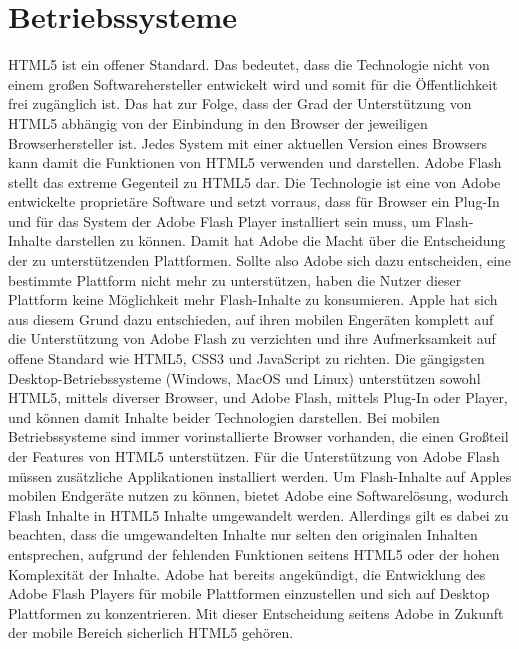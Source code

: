 \section{Betriebssysteme}
HTML5 ist ein offener Standard. Das bedeutet, dass die Technologie nicht
von einem großen Softwarehersteller entwickelt wird und somit für die
Öffentlichkeit frei zugänglich ist. Das hat zur Folge, dass der Grad der
Unterstützung von HTML5 abhängig von der Einbindung in den Browser der
jeweiligen Browserhersteller ist. Jedes System mit einer aktuellen Version
eines Browsers kann damit die Funktionen von HTML5 verwenden und darstellen.
\newline\newline
Adobe Flash stellt das extreme Gegenteil zu HTML5 dar. Die Technologie ist
eine von Adobe entwickelte proprietäre Software und setzt vorraus, dass für
Browser ein Plug-In und für das System der Adobe Flash Player installiert sein
muss, um Flash-Inhalte darstellen zu können. Damit hat Adobe die Macht über die
Entscheidung der zu unterstützenden Plattformen. Sollte also Adobe sich dazu
entscheiden, eine bestimmte Plattform nicht mehr zu unterstützen, haben die
Nutzer dieser Plattform keine Möglichkeit mehr Flash-Inhalte zu konsumieren.
Apple hat sich aus diesem Grund dazu entschieden, auf ihren mobilen Engeräten
komplett auf die Unterstützung von Adobe Flash zu verzichten und ihre
Aufmerksamkeit auf offene Standard wie HTML5, CSS3 und JavaScript zu richten.
\newline\newline
Die gängigsten Desktop-Betriebssysteme (Windows, MacOS und Linux)
unterstützen sowohl HTML5, mittels diverser Browser, und Adobe Flash, mittels
Plug-In oder Player, und können damit Inhalte beider Technologien darstellen.
Bei mobilen Betriebssysteme sind immer vorinstallierte Browser vorhanden,
die einen Großteil der Features von HTML5 unterstützen. Für die Unterstützung
von Adobe Flash müssen zusätzliche Applikationen installiert werden.
\newline\newline
Um Flash-Inhalte auf Apples mobilen Endgeräte nutzen zu können, bietet Adobe
eine Softwarelösung, wodurch Flash Inhalte in HTML5 Inhalte umgewandelt werden.
Allerdings gilt es dabei zu beachten, dass die umgewandelten Inhalte nur
selten den originalen Inhalten entsprechen, aufgrund der fehlenden Funktionen
seitens HTML5 oder der hohen Komplexität der Inhalte. Adobe hat bereits
angekündigt, die Entwicklung des Adobe Flash Players für mobile Plattformen
einzustellen und sich auf Desktop Plattformen zu konzentrieren. Mit dieser
Entscheidung seitens Adobe in Zukunft der mobile Bereich sicherlich HTML5
gehören.

